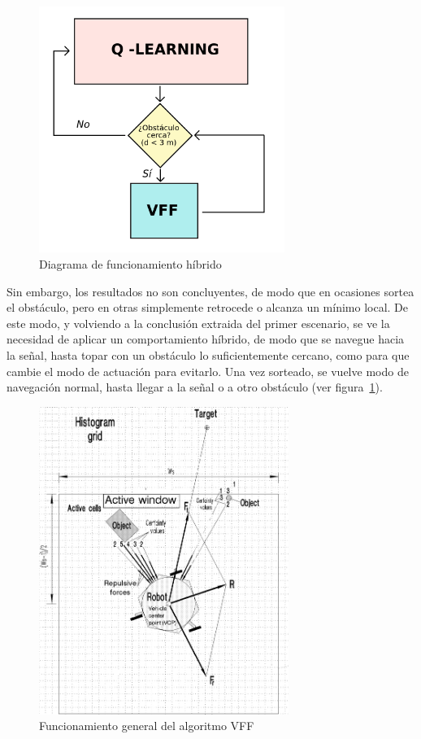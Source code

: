 \begin{figure} [tp]
    \begin{center}
    \includegraphics[height=8cm]{imagenes/cap4/29_hyb.png}
    \end{center}
    \caption[Diagrama de funcionamiento híbrido]{Diagrama de funcionamiento híbrido}
    \label{fig:hyb}
\end{figure}

Sin embargo, los resultados no son concluyentes, de modo que en ocasiones sortea el obstáculo, pero en otras simplemente retrocede o alcanza un mínimo local. De este modo, y volviendo a la conclusión extraida del primer escenario, se ve la necesidad de aplicar un comportamiento híbrido, de modo que se navegue hacia la señal, hasta topar con un obstáculo lo suficientemente cercano, como para que cambie el modo de actuación para evitarlo. Una vez sorteado, se vuelve modo de navegación normal, hasta llegar a la señal o a otro obstáculo (ver figura~\ref{fig:hyb}).\\

\begin{figure} [tp]
    \begin{center}
    \includegraphics[height=10cm]{imagenes/cap4/30_vff.png}
    \end{center}
    \caption[Funcionamiento general del algoritmo \ac{VFF}]{Funcionamiento general del algoritmo \ac{VFF}}
    \label{fig:vffwork}
\end{figure}

